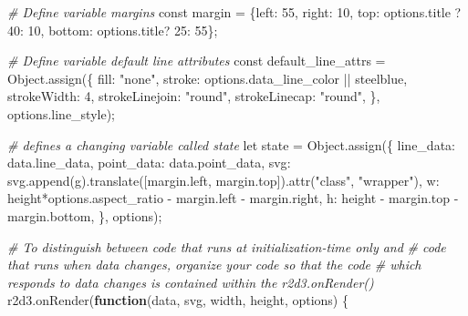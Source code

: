 \documentclass[print]{nuthesis}
\newenvironment{Shaded}{\begin{snugshade}}{\end{snugshade}}
\newcommand{\CommentTok}[1]{\textcolor[rgb]{0.56,0.35,0.01}{\textit{#1}}}
\newcommand{\ControlFlowTok}[1]{\textcolor[rgb]{0.13,0.29,0.53}{\textbf{#1}}}
\newcommand{\DecValTok}[1]{\textcolor[rgb]{0.00,0.00,0.81}{#1}}
\newcommand{\FunctionTok}[1]{\textcolor[rgb]{0.00,0.00,0.00}{#1}}
\newcommand{\NormalTok}[1]{#1}
\newcommand{\OtherTok}[1]{\textcolor[rgb]{0.56,0.35,0.01}{#1}}
\newcommand{\SpecialCharTok}[1]{\textcolor[rgb]{0.00,0.00,0.00}{#1}}
\newcommand{\StringTok}[1]{\textcolor[rgb]{0.31,0.60,0.02}{#1}}
\begin{document}
\begin{Shaded}
\begin{Highlighting}[]
\CommentTok{\# Define variable margins}
\NormalTok{const margin }\OtherTok{=}\NormalTok{ \{left}\SpecialCharTok{:} \DecValTok{55}\NormalTok{, }
\NormalTok{                right}\SpecialCharTok{:} \DecValTok{10}\NormalTok{, }
\NormalTok{                top}\SpecialCharTok{:}\NormalTok{ options.title ? }\DecValTok{40}\SpecialCharTok{:} \DecValTok{10}\NormalTok{, }
\NormalTok{                bottom}\SpecialCharTok{:}\NormalTok{ options.title? }\DecValTok{25}\SpecialCharTok{:} \DecValTok{55}\NormalTok{\};}

\CommentTok{\# Define variable default line attributes}
\NormalTok{const default\_line\_attrs }\OtherTok{=} \FunctionTok{Object.assign}\NormalTok{(\{}
\NormalTok{  fill}\SpecialCharTok{:} \StringTok{"none"}\NormalTok{,}
\NormalTok{  stroke}\SpecialCharTok{:}\NormalTok{ options.data\_line\_color }\SpecialCharTok{||} \StringTok{\textquotesingle{}steelblue\textquotesingle{}}\NormalTok{,}
\NormalTok{  strokeWidth}\SpecialCharTok{:} \DecValTok{4}\NormalTok{,}
\NormalTok{  strokeLinejoin}\SpecialCharTok{:} \StringTok{"round"}\NormalTok{,}
\NormalTok{  strokeLinecap}\SpecialCharTok{:} \StringTok{"round"}\NormalTok{,}
\NormalTok{\}, options.line\_style);}

\CommentTok{\# defines a changing variable called state}
\NormalTok{let state }\OtherTok{=} \FunctionTok{Object.assign}\NormalTok{(\{}
\NormalTok{  line\_data}\SpecialCharTok{:}\NormalTok{ data.line\_data,}
\NormalTok{  point\_data}\SpecialCharTok{:}\NormalTok{ data.point\_data,}
\NormalTok{  svg}\SpecialCharTok{:} \FunctionTok{svg.append}\NormalTok{(}\StringTok{\textquotesingle{}g\textquotesingle{}}\NormalTok{)}\FunctionTok{.translate}\NormalTok{([margin.left, margin.top])}\FunctionTok{.attr}\NormalTok{(}\StringTok{"class"}\NormalTok{, }\StringTok{"wrapper"}\NormalTok{),}
\NormalTok{  w}\SpecialCharTok{:}\NormalTok{ height}\SpecialCharTok{*}\NormalTok{options.aspect\_ratio }\SpecialCharTok{{-}}\NormalTok{ margin.left }\SpecialCharTok{{-}}\NormalTok{ margin.right,}
\NormalTok{  h}\SpecialCharTok{:}\NormalTok{ height }\SpecialCharTok{{-}}\NormalTok{ margin.top }\SpecialCharTok{{-}}\NormalTok{ margin.bottom,}
\NormalTok{\}, options);}

\CommentTok{\# To distinguish between code that runs at initialization{-}time only and}
\CommentTok{\# code that runs when data changes, organize your code so that the code}
\CommentTok{\# which responds to data changes is contained within the r2d3.onRender()}
\FunctionTok{r2d3.onRender}\NormalTok{(}\ControlFlowTok{function}\NormalTok{(data, svg, width, height, options) \{}
  

\end{Highlighting}
\end{Shaded}
\end{document}

